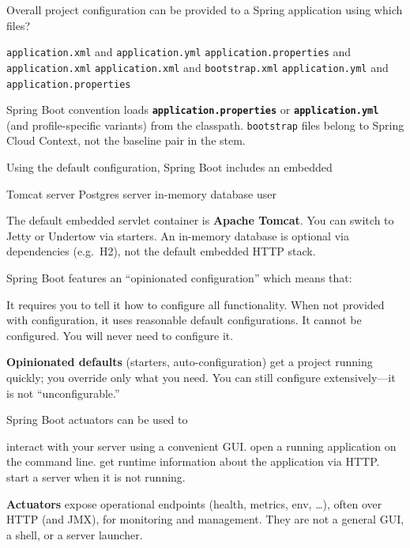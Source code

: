 \newpage

\question[4]
Overall project configuration can be provided to a Spring application using which files?
\begin{choices}
  \choice \texttt{application.xml} and \texttt{application.yml}
  \choice \texttt{application.properties} and \texttt{application.xml}
  \choice \texttt{application.xml} and \texttt{bootstrap.xml}
  \CorrectChoice \texttt{application.yml} and \texttt{application.properties}
\end{choices}
\begin{solution}
  Spring Boot convention loads \textbf{\texttt{application.properties}} or \textbf{\texttt{application.yml}} (and profile-specific variants) from the classpath. \texttt{bootstrap} files belong to Spring Cloud Context, not the baseline pair in the stem.
\end{solution}

\question[4]
Using the default configuration, Spring Boot includes an embedded
\begin{choices}
  \CorrectChoice Tomcat server
  \choice Postgres server
  \choice in-memory database
  \choice user
\end{choices}
\begin{solution}
  The default embedded servlet container is \textbf{Apache Tomcat}. You can switch to Jetty or Undertow via starters. An in-memory database is optional via dependencies (e.g.\ H2), not the default embedded HTTP stack.
\end{solution}

\question[4]
Spring Boot features an ``opinionated configuration'' which means that:
\begin{choices}
  \choice It requires you to tell it how to configure all functionality.
  \CorrectChoice When not provided with configuration, it uses reasonable default configurations.
  \choice It cannot be configured.
  \choice You will never need to configure it.
\end{choices}
\begin{solution}
  \textbf{Opinionated defaults} (starters, auto-configuration) get a project running quickly; you override only what you need. You can still configure extensively---it is not ``unconfigurable.''
\end{solution}

\question[4]
Spring Boot actuators can be used to
\begin{choices}
  \choice interact with your server using a convenient GUI.
  \choice open a running application on the command line.
  \CorrectChoice get runtime information about the application via HTTP.
  \choice start a server when it is not running.
\end{choices}
\begin{solution}
  \textbf{Actuators} expose operational endpoints (health, metrics, env, \ldots), often over HTTP (and JMX), for monitoring and management. They are not a general GUI, a shell, or a server launcher.
\end{solution}

